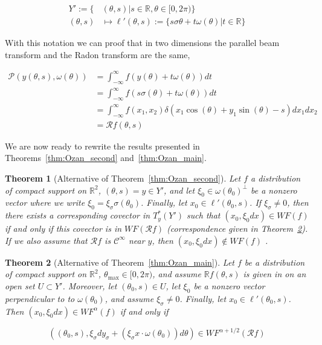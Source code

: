 \documentclass[a4paper]{article}
\newtheorem{theorem}{Theorem}
\begin{document}
$$
\begin{aligned}
Y':=\{& (\theta,s)| s\in \mathbb{R},\theta\in [0,2\pi)\}\\
(\theta,s)&\mapsto \ell'(\theta,s):=\{s\sigma{\theta}+t\omega(\theta)|t\in\mathbb{R}\}
\end{aligned}
$$

\bigskip

With this notation we can proof that in two dimensions the parallel beam transform and the Radon transform are the same,

$$
\begin{aligned}
\mathcal{P}(y(\theta,s),\omega(\theta))&=\int_{-\infty}^{\infty}f(y(\theta)+t\omega(\theta))dt\\
&=\int_{-\infty}^{\infty}f(s\sigma(\theta)+t\omega(\theta))dt\\
&=\int_{-\infty}^{\infty}f(x_1,x_2)\delta(x_1\cos(\theta)+y_1\sin(\theta)-s)dx_1dx_2\\
&=\mathcal{R}f(\theta,s)
\end{aligned}
$$

\bigskip

We are now ready to rewrite the results presented in Theorems~\ref{thm:Ozan_second} and~\ref{thm:Ozan_main}. 

\bigskip

\begin{theorem}[Alternative of Theorem~\ref{thm:Ozan_second}]
Let $f$ a distribution of compact support on $\mathbb{R}^2$, $(\theta,s)=y\in Y'$, and let $\xi_0\in\omega(\theta_0)^{\perp}$ be a nonzero vector where we write $\xi_0=\xi_{\sigma}\sigma(\theta_0)$. Finally, let $x_0\in\ell'(\theta_0,s)$. If $\xi_{\sigma}\neq 0$, then there exists a corresponding covector in $T^*_y(Y')$ such that $(x_0,\xi_0dx)\in WF(f)$ if and only if this covector is in $WF(\mathcal{R}f)$ (correspondence given in Theorem~\ref{thm:Ozanmainalt}). If we also assume that $\mathcal{R}f$ is $\mathcal{C}^{\infty}$ near $y$, then $(x_0,\xi_0dx)\not\in WF(f)$ .
\end{theorem}

\bigskip

\begin{theorem}[Alternative of Theorem~\ref{thm:Ozan_main}]
\label{thm:Ozanmainalt}
Let $f$ be a distribution of compact support on $\mathbb{R}^2$, $\theta_{\max}\in [0,2\pi)$, and assume $\mathbb{R}f(\theta,s)$ is given in on an open set $U\subset Y'$. Moreover, let $(\theta_0,s)\in U$, let $\xi_0$ be a nonzero vector perpendicular to to $\omega(\theta_0)$, and assume $\xi_{\sigma}\neq 0$. Finally, let $x_0\in \ell'(\theta_0,s)$. Then $(x_0,\xi_0dx)\in WF^{\alpha}(f)$ if and only if

$$
((\theta_0,s),\xi_{\sigma}dy_{\sigma}+(\xi_{\sigma}x\cdot \omega(\theta_0))d\theta)\in WF^{\alpha+1/2}(\mathcal{R}f)
$$
\end{theorem}
\end{document}
